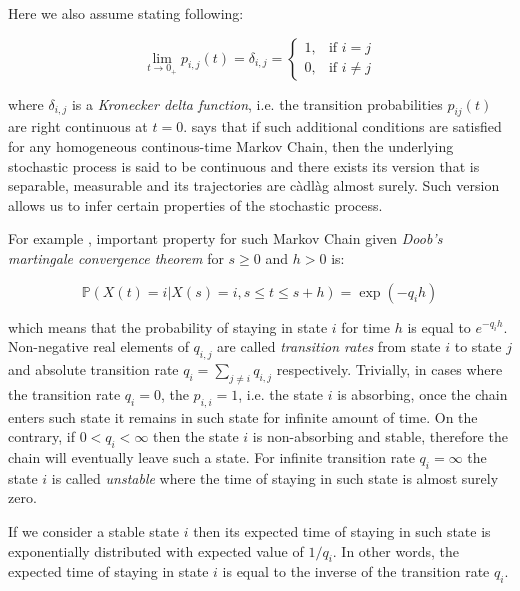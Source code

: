 Here we also assume \cite{Gallager2013} stating following:

\begin{equation}
    \lim_{t \to 0_{+}} p_{i,j}(t) = \delta_{i,j} = 
        \begin{cases}
            1, & \text{if } i = j\\
            0, & \text{if } i \neq j
        \end{cases}
\end{equation}

where $\delta_{i,j}$ is a \textit{Kronecker delta function}, i.e. the transition probabilities $p_{ij}(t)$ are right continuous at $t=0$. \cite{Norris2012} says that if such additional conditions are satisfied for any homogeneous continous-time Markov Chain, 
then the underlying stochastic process is said to be continuous and there exists its version that is separable, measurable and its trajectories are càdlàg almost surely. Such version allows us to infer 
certain properties of the stochastic process.

For example \cite{}, important property for such Markov Chain given \textit{Doob's martingale convergence theorem} for $s \geq 0$ and $h>0$ is:

\begin{equation}
    \mathbb{P}(X(t) = i|X(s)=i, s \leq t \leq s+h) = \exp(-{q_i}h)
\end{equation}

which means that the probability of staying in state $i$ for time $h$ is equal to $e^{-{q_i}h}$. 
Non-negative real elements of $q_{i,j}$ are called \textit{transition rates} from state $i$ to state $j$ and absolute transition 
rate $q_i = \sum_{j \neq i} q_{i,j}$ respectively. Trivially, in cases where the transition rate $q_i=0$, the $p_{i,i} = 1$, i.e. the state $i$ is absorbing, 
once the chain enters such state it remains in such state for infinite amount of time. On the contrary, if $0 < q_i < \infty$ then the state $i$ is non-absorbing and stable, therefore
the chain will eventually leave such a state. For infinite transition rate $q_i = \infty$ the state $i$ is called {\it unstable} where the time of staying in such state is almost surely zero. \cite{Praskova2012}

If we consider a stable state $i$ then its expected time of staying in such state is exponentially 
distributed with expected value of $1/q_i$. In other words, the expected time of staying in state $i$ is equal 
to the inverse of the transition rate $q_i$. \cite{Norris2012}

